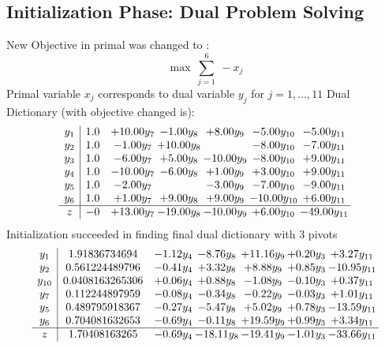 \documentclass[8pt]{article}
\begin{document}
\subsection{Initialization Phase: Dual Problem Solving}
New Objective in primal was changed to : \[ \max\ \sum_{j=1}^{6}\ - x_j \] 
Primal variable $x_j$ corresponds to dual variable $y_j$ for $j = 1,\ldots,11$
Dual Dictionary (with objective changed is): 
\[\begin{array}{c| c c@{\hskip 2pt} c@{\hskip 2pt} c@{\hskip 2pt} c@{\hskip 2pt} c@{\hskip 2pt} }
 y_{1}   &  1.0 & + 10.00 y_{7} & -1.00 y_{8} & +  8.00 y_{9} & -5.00 y_{10} & -5.00 y_{11}\\
 y_{2}   &  1.0 & -1.00 y_{7} & + 10.00 y_{8} &   & -8.00 y_{10} & -7.00 y_{11}\\
 y_{3}   &  1.0 & -6.00 y_{7} & +  5.00 y_{8} & -10.00 y_{9} & -8.00 y_{10} & +  9.00 y_{11}\\
 y_{4}   &  1.0 & -10.00 y_{7} & -6.00 y_{8} & +  1.00 y_{9} & +  3.00 y_{10} & +  9.00 y_{11}\\
 y_{5}   &  1.0 & -2.00 y_{7} &   & -3.00 y_{9} & -7.00 y_{10} & -9.00 y_{11}\\
 y_{6}   &  1.0 & +  1.00 y_{7} & +  9.00 y_{8} & +  9.00 y_{9} & -10.00 y_{10} & +  6.00 y_{11}\\
\hline
z    &  -0 & + 13.00 y_{7} & -19.00 y_{8} & -10.00 y_{9} & +  6.00 y_{10} & -49.00 y_{11}\\
\end{array}\]
Initialization succeeded in finding final dual dictionary with 3 pivots
\[\begin{array}{c| c c@{\hskip 2pt} c@{\hskip 2pt} c@{\hskip 2pt} c@{\hskip 2pt} c@{\hskip 2pt} }
 y_{1}   &  1.91836734694 & -1.12 y_{4} & -8.76 y_{8} & + 11.16 y_{9} & +  0.20 y_{3} & +  3.27 y_{11}\\
 y_{2}   &  0.561224489796 & -0.41 y_{4} & +  3.32 y_{8} & +  8.88 y_{9} & +  0.85 y_{3} & -10.95 y_{11}\\
 y_{10}   &  0.0408163265306 & +  0.06 y_{4} & +  0.88 y_{8} & -1.08 y_{9} & -0.10 y_{3} & +  0.37 y_{11}\\
 y_{7}   &  0.112244897959 & -0.08 y_{4} & -0.34 y_{8} & -0.22 y_{9} & -0.03 y_{3} & +  1.01 y_{11}\\
 y_{5}   &  0.489795918367 & -0.27 y_{4} & -5.47 y_{8} & +  5.02 y_{9} & +  0.78 y_{3} & -13.59 y_{11}\\
 y_{6}   &  0.704081632653 & -0.69 y_{4} & -0.11 y_{8} & + 19.59 y_{9} & +  0.99 y_{3} & +  3.34 y_{11}\\
\hline
z    &  1.70408163265 & -0.69 y_{4} & -18.11 y_{8} & -19.41 y_{9} & -1.01 y_{3} & -33.66 y_{11}\\
\end{array}\]
\end{document}
